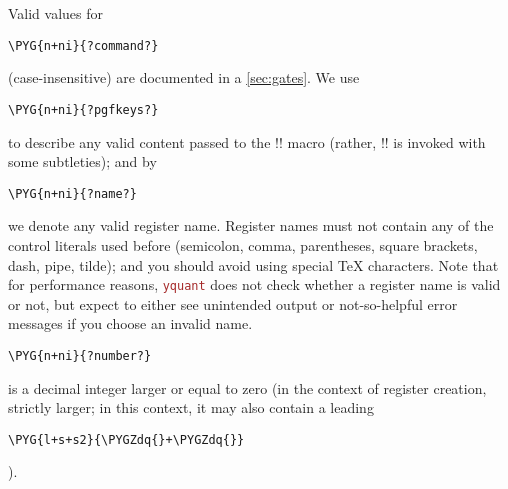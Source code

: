 \documentclass{scrartcl}
\def\pkg#1{\textcolor{brown}{\texttt{#1}}}
\def\Yquant{\pkg{yquant}}
\begin{document}
         Valid values for
         \begin{BVerbatim}[commandchars=\\\{\}]
\PYG{n+ni}{?command?}
         \end{BVerbatim}
         \space (case\hyp insensitive) are documented in a \cref{sec:gates}.
         We use
         \begin{BVerbatim}[commandchars=\\\{\}]
\PYG{n+ni}{?pgfkeys?}
         \end{BVerbatim}
         \space to describe any valid content passed to the \tex!\pgfkeys! macro (rather, \tex!\yquantset! is invoked with some subtleties); and by
         \begin{BVerbatim}[commandchars=\\\{\}]
\PYG{n+ni}{?name?}
         \end{BVerbatim}
         \space we denote any valid register name.
         Register names must not contain any of the control literals used before (semicolon, comma, parentheses, square brackets, dash, pipe, tilde); and you should avoid using special \TeX{} characters.
         Note that for performance reasons, \Yquant{} does not check whether a register name is valid or not, but expect to either see unintended output or not\hyp so\hyp helpful error messages if you choose an invalid name.
         \begin{BVerbatim}[commandchars=\\\{\}]
\PYG{n+ni}{?number?}
         \end{BVerbatim}
         \space is a decimal integer larger or equal to zero (in the context of register creation, strictly larger; in this context, it may also contain a leading
         \begin{BVerbatim}[commandchars=\\\{\}]
\PYG{l+s+s2}{\PYGZdq{}+\PYGZdq{}}
         \end{BVerbatim}
         ).
         
\end{document}
